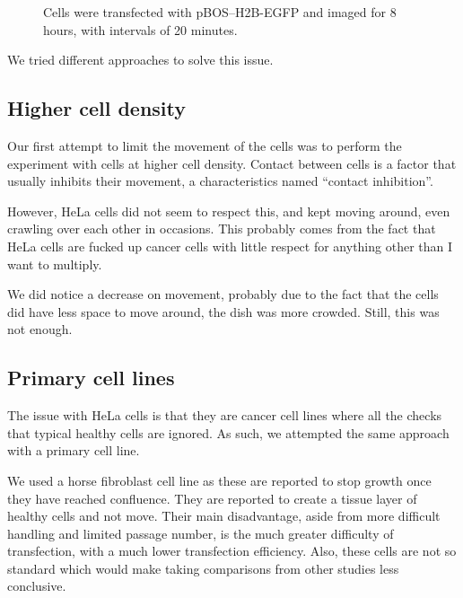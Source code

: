   \begin{figure}
    \centering
                 {Cells were transfected with pBOS--H2B-EGFP and imaged for 8
                  hours, with intervals of 20 minutes.}
    \label{fig:cell-movement}
  \end{figure}
  
  We tried different approaches to solve this issue.
  
  \subsection{Higher cell density}
  
    Our first attempt to limit the movement of the cells was to perform the experiment with
    cells at higher cell density.  Contact between cells is a factor that usually inhibits
    their movement, a characteristics named ``contact inhibition''.
    
    However, HeLa cells did not seem to respect this, and kept moving around, even crawling
    over each other in occasions. This probably comes from the fact that HeLa cells are fucked
    up cancer cells with little respect for anything other than I want to multiply.
    
    We did notice a decrease on movement, probably due to the fact that the cells did have less
    space to move around, the dish was more crowded. Still, this was not enough.

  \subsection{Primary cell lines}
  \label{sec:frap-movement-horse}
  
    The issue with HeLa cells is that they are cancer cell lines where all the checks that typical
    healthy cells are ignored. As such, we attempted the same approach with a primary cell line.
    
    We used a horse fibroblast cell line as these are reported to stop growth once they have reached
    confluence. They are reported to create a tissue layer of healthy cells and not move. Their main
    disadvantage, aside from more difficult handling and limited passage number, is the much greater
    difficulty of transfection, with a much lower  transfection efficiency. Also, these cells are not
    so standard which would make taking comparisons from other studies less conclusive.
    
